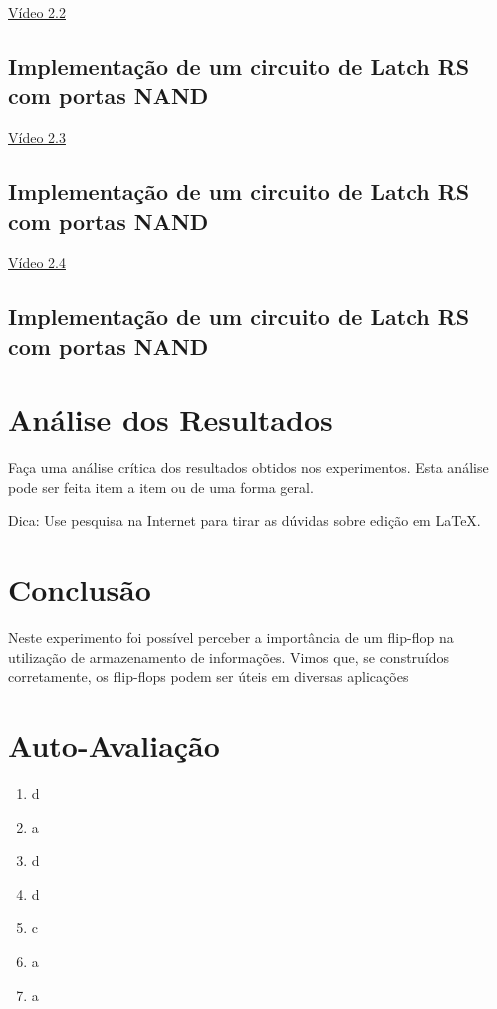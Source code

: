 \documentclass[12pt]{article}
\begin{document}
\href{https://youtu.be/azJt3y337BE}{Vídeo 2.2}

\subsection{Implementação de um circuito de Latch RS com portas NAND}
\label{2.3}

\href{https://youtu.be/1GDHpbQ8CnU}{Vídeo 2.3}

\subsection{Implementação de um circuito de Latch RS com portas NAND}
\label{2.4}

\href{https://youtu.be/c2MW7RQl_7s}{Vídeo 2.4}

\subsection{Implementação de um circuito de Latch RS com portas NAND}
\label{2.5}



\section{Análise dos Resultados}
\label{sec:Resultados}

Faça uma análise crítica dos resultados obtidos nos experimentos. Esta análise pode ser feita item a item ou de uma forma geral.

Dica: Use pesquisa na Internet para tirar as dúvidas sobre edição em \LaTeX .

\section{Conclusão}
\label{sec:Conclusao}

Neste experimento foi possível perceber a importância de um flip-flop na utilização de armazenamento de informações. Vimos que, se construídos corretamente, os flip-flops podem ser úteis em diversas aplicações

\newpage 
\section*{Auto-Avaliação}

\begin{enumerate}
    \item d
    \item a
    \item d
    \item d
    \item c
    \item a
    \item a
\end{enumerate}
\end{document}
